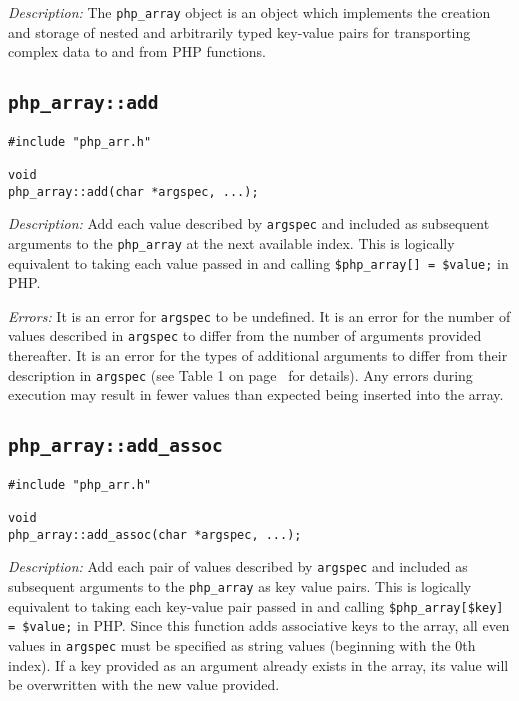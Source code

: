 \documentclass[11pt,titlepage]{article}
\begin{document}
\emph{Description:} The \verb|php_array| object is an object which implements the creation and storage of nested and arbitrarily typed key-value pairs for transporting complex data to and from PHP functions.


\subsection{\texttt{php\_array::add}}

\begin{verbatim}
#include "php_arr.h"

void 
php_array::add(char *argspec, ...);
\end{verbatim}

\emph{Description:} Add each value described by \verb|argspec| and included as subsequent arguments to the \verb|php_array| at the next available index. This is logically equivalent to taking each value passed in and calling \verb|$php_array[] = $value;| in PHP. 

\emph{Errors:} It is an error for \verb|argspec| to be undefined. It is an error for the number of values described in \verb|argspec| to differ from the number of arguments provided thereafter. It is an error for the types of additional arguments to differ from their description in \verb|argspec| (see Table 1 on page~\pageref{Table1} for details). Any errors during execution may result in fewer values than expected being inserted into the array.


\subsection{\texttt{php\_array::add\_assoc}}

\begin{verbatim}
#include "php_arr.h"

void 
php_array::add_assoc(char *argspec, ...);
\end{verbatim}

\emph{Description:} Add each pair of values described by \verb|argspec| and included as subsequent arguments to the \verb|php_array| as key value pairs. This is logically equivalent to taking each key-value pair passed in and calling \verb|$php_array[$key] = $value;| in PHP. Since this function adds associative keys to the array, all even values in \verb|argspec| must be specified as string values (beginning with the 0th index). If a key provided as an argument already exists in the array, its value will be overwritten with the new value provided.
\end{document}
